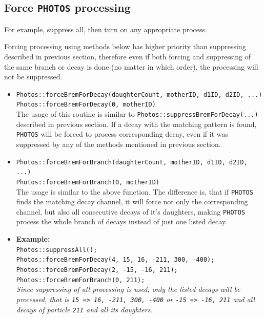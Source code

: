 \documentclass[]{Photos_interface_design}
\begin{document}
\subsection{Force {\tt PHOTOS} processing }
\label{section:force}

For example, suppress all, then turn on any appropriate process.

Forcing processing using methods below has higher priority than suppressing described
in previous section, therefore even if both forcing and suppressing of the same
branch or decay is done (no matter in which order), the processing will not be
suppressed.

\begin{itemize}

 \item {\tt Photos::forceBremForDecay(daughterCount, motherID, d1ID, d2ID, ...)} \hfill \\
       {\tt Photos::forceBremForDecay(0, motherID)} \hfill \\
       The usage of this routine is similar to {\tt Photos::suppressBremForDecay(...)}
	   described in previous section. If a decay with the matching pattern is found,
	   {\tt PHOTOS} will be forced to process corresponding decay, even if it was suppressed
	   by any of the methods mentioned in previous section.
 \item {\tt Photos::forceBremForBranch(daughterCount, motherID, d1ID, d2ID, ...)} \hfill \\
       {\tt Photos::forceBremForBranch(0, motherID)} \hfill \\
       The usage is similar to the above function. The difference is,
	   that if {\tt PHOTOS} finds the matching decay channel, it will force not only the corresponding channel,
	   but also all consecutive decays of it's daughters, making {\tt PHOTOS} process the whole branch
	   of decays instead of just one listed decay.
 \item \textbf{Example:} \hfill \\
{\tt Photos::suppressAll(); } \\
{\tt Photos::forceBremForDecay(4, 15, 16, -211, 300, -400); } \\
{\tt Photos::forceBremForDecay(2, -15, -16, 211); } \\
{\tt Photos::forceBremForBranch(0, 211); } \\
\emph{Since suppressing of all processing is used, only the listed decays will be processed, that is
{\tt 15 => 16, -211, 300, -400} or {\tt -15 => -16, 211} and all decays of particle {\tt 211} and
all its daughters.}
\end{itemize}
\end{document}
